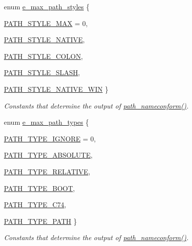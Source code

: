 \begin{DoxyCompactItemize}
\item 
enum \hyperlink{group__files_gaaf8f3fbe8b4ab0b73258a6b782461867}{e\_\-max\_\-path\_\-styles} \{ \par
\hyperlink{group__files_ggaaf8f3fbe8b4ab0b73258a6b782461867a765ba1acf48b931a40a8e9a6bd451c76}{PATH\_\-STYLE\_\-MAX} =  0, 
\par
\hyperlink{group__files_ggaaf8f3fbe8b4ab0b73258a6b782461867accd897b92c35c682adb9714ce41aea2a}{PATH\_\-STYLE\_\-NATIVE}, 
\par
\hyperlink{group__files_ggaaf8f3fbe8b4ab0b73258a6b782461867a86782cc5d0027799047c845ab43c1b49}{PATH\_\-STYLE\_\-COLON}, 
\par
\hyperlink{group__files_ggaaf8f3fbe8b4ab0b73258a6b782461867a04dc9f3f099d8b89914a8c3137b821bf}{PATH\_\-STYLE\_\-SLASH}, 
\par
\hyperlink{group__files_ggaaf8f3fbe8b4ab0b73258a6b782461867a3a76a78a4fb2f8e5e15e6f1a0f19c77a}{PATH\_\-STYLE\_\-NATIVE\_\-WIN}
 \}
\begin{DoxyCompactList}\small\item\em Constants that determine the output of \hyperlink{group__files_gaaf014af82bc666cd974b83441eb4c9c6}{path\_\-nameconform()}. \item\end{DoxyCompactList}\item 
enum \hyperlink{group__files_gac6a8a4db7a7de5fbc21188399713c7ee}{e\_\-max\_\-path\_\-types} \{ \par
\hyperlink{group__files_ggac6a8a4db7a7de5fbc21188399713c7eea1a5d068eb3dae46260f4253802e3e28b}{PATH\_\-TYPE\_\-IGNORE} =  0, 
\par
\hyperlink{group__files_ggac6a8a4db7a7de5fbc21188399713c7eead850bb682f8d77498e849865e90fa449}{PATH\_\-TYPE\_\-ABSOLUTE}, 
\par
\hyperlink{group__files_ggac6a8a4db7a7de5fbc21188399713c7eea0acdd2cb86fc9700e407d57cb6818746}{PATH\_\-TYPE\_\-RELATIVE}, 
\par
\hyperlink{group__files_ggac6a8a4db7a7de5fbc21188399713c7eeac1a379d26316cf1d35ec7c24ce9671fd}{PATH\_\-TYPE\_\-BOOT}, 
\par
\hyperlink{group__files_ggac6a8a4db7a7de5fbc21188399713c7eeadb5b0a35c5564b3b96ec928bf88ae0db}{PATH\_\-TYPE\_\-C74}, 
\par
\hyperlink{group__files_ggac6a8a4db7a7de5fbc21188399713c7eea76c8d7d75dcb6ac1080713187390197c}{PATH\_\-TYPE\_\-PATH}
 \}
\begin{DoxyCompactList}\small\item\em Constants that determine the output of \hyperlink{group__files_gaaf014af82bc666cd974b83441eb4c9c6}{path\_\-nameconform()}. \item\end{DoxyCompactList}\item 

\end{DoxyCompactItemize}
